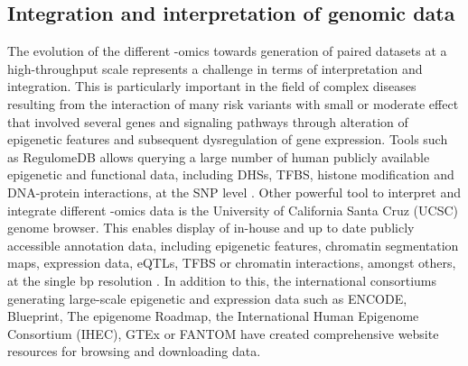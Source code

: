 



\subsection{Integration and interpretation of genomic data}
The evolution of the different -omics towards generation of paired datasets at a high-throughput scale represents a challenge in terms of interpretation and integration. This is particularly important in the field of complex diseases resulting from the interaction of many risk variants with small or moderate effect that involved several genes and signaling pathways through alteration of epigenetic features and subsequent dysregulation of gene expression.
Tools such as RegulomeDB allows querying a large number of human publicly available epigenetic and functional data, including DHSs, TFBS, histone modification and DNA-protein interactions, at the SNP level \parencite{Boyle2012}. Other powerful tool to interpret and integrate different -omics data is the University of California Santa Cruz (UCSC) genome browser. This enables display of in-house and up to date publicly accessible annotation data, including epigenetic features, chromatin segmentation maps, expression data, eQTLs, TFBS or chromatin interactions, amongst others, at the single bp resolution \parencite{Kent2002}. In addition to this, the international consortiums generating large-scale epigenetic and expression data such as ENCODE, Blueprint, The epigenome Roadmap, the International Human Epigenome Consortium (IHEC), GTEx or FANTOM have created comprehensive website resources for browsing and downloading data.

